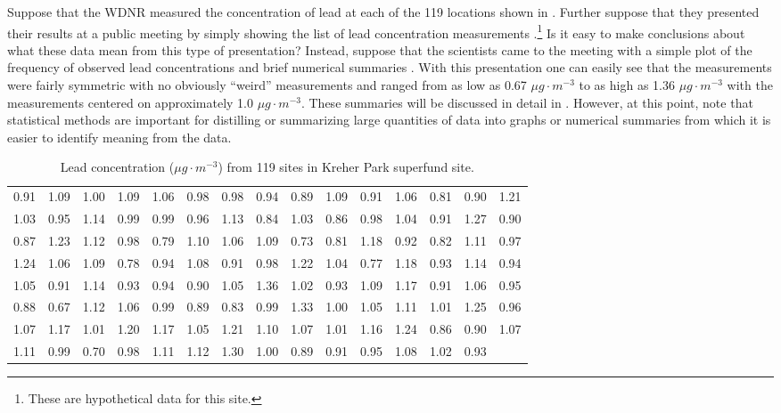 \documentclass[10pt,openany]{book}\usepackage[]{graphicx}\usepackage[]{color}
\begin{document}
Suppose that the WDNR measured the concentration of lead at each of the 119 locations shown in . Further suppose that they presented their results at a public meeting by simply showing the list of lead concentration measurements .\footnote{These are hypothetical data for this site.}  Is it easy to make conclusions about what these data mean from this type of presentation?  Instead, suppose that the scientists came to the meeting with a simple plot of the frequency of observed lead concentrations and brief numerical summaries .  With this presentation one can easily see that the measurements were fairly symmetric with no obviously ``weird'' measurements and ranged from as low as 0.67 $\mu g \cdot m^{-3}$ to as high as 1.36 $\mu g \cdot m^{-3}$ with the measurements centered on approximately 1.0 $\mu g \cdot m^{-3}$.  These summaries will be discussed in detail in .  However, at this point, note that statistical methods are important for distilling or summarizing large quantities of data into graphs or numerical summaries from which it is easier to identify meaning from the data.

\begin{table}[htbp]   \label{tab:KreherParkPbconc}
  \caption{Lead concentration ($\mu g \cdot m^{-3}$) from 119 sites in Kreher Park superfund site.}
  \begin{center}
\begin{tabular}{rrrrrrrrrrrrrrr}
  \hline
  \hline
0.91 & 1.09 & 1.00 & 1.09 & 1.06 & 0.98 & 0.98 & 0.94 & 0.89 & 1.09 & 0.91 & 1.06 & 0.81 & 0.90 & 1.21 \\ 
  1.03 & 0.95 & 1.14 & 0.99 & 0.99 & 0.96 & 1.13 & 0.84 & 1.03 & 0.86 & 0.98 & 1.04 & 0.91 & 1.27 & 0.90 \\ 
  0.87 & 1.23 & 1.12 & 0.98 & 0.79 & 1.10 & 1.06 & 1.09 & 0.73 & 0.81 & 1.18 & 0.92 & 0.82 & 1.11 & 0.97 \\ 
  1.24 & 1.06 & 1.09 & 0.78 & 0.94 & 1.08 & 0.91 & 0.98 & 1.22 & 1.04 & 0.77 & 1.18 & 0.93 & 1.14 & 0.94 \\ 
  1.05 & 0.91 & 1.14 & 0.93 & 0.94 & 0.90 & 1.05 & 1.36 & 1.02 & 0.93 & 1.09 & 1.17 & 0.91 & 1.06 & 0.95 \\ 
  0.88 & 0.67 & 1.12 & 1.06 & 0.99 & 0.89 & 0.83 & 0.99 & 1.33 & 1.00 & 1.05 & 1.11 & 1.01 & 1.25 & 0.96 \\ 
  1.07 & 1.17 & 1.01 & 1.20 & 1.17 & 1.05 & 1.21 & 1.10 & 1.07 & 1.01 & 1.16 & 1.24 & 0.86 & 0.90 & 1.07 \\ 
  1.11 & 0.99 & 0.70 & 0.98 & 1.11 & 1.12 & 1.30 & 1.00 & 0.89 & 0.91 & 0.95 & 1.08 & 1.02 & 0.93 &  \\ 
   \hline
\end{tabular}

  \end{center}
\end{table}
\end{document}

